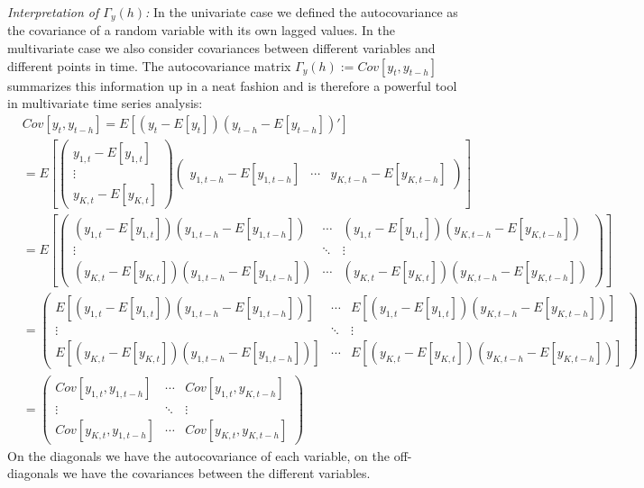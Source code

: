 \begin{enumerate}
\emph{Interpretation of \(\Gamma_y(h)\):}
In the univariate case we defined the autocovariance as the covariance of a random variable with its own lagged values.
In the multivariate case we also consider covariances between different variables and different points in time.
The autocovariance matrix \({\Gamma_y(h)} := Cov[{y_{t},{y_{t-h}}}]\) summarizes this information up in a neat fashion
  and is therefore a powerful tool in multivariate time series analysis:
\begin{align*}
& Cov[{y_{t},{y_{t-h}}}] = E\left[({y_{t}}-E[{{y_{t}}}]) ({y_{t-h}}-E[{{y_{t-h}}}])' \right]
\\
&= E\left[\begin{pmatrix} y_{1,t} - E[y_{1,t}] \\ \vdots \\ y_{K,t} - E[y_{K,t}] \end{pmatrix}
\begin{pmatrix} y_{1,{t-h}} - E[y_{1,{t-h}}] & \cdots & y_{K,{t-h}} - E[y_{K,{t-h}}]  \end{pmatrix} \right]
\\
&= E\left[\begin{pmatrix}
(y_{1,t}- E[y_{1,t}]) (y_{1,{t-h}} - E[y_{1,{t-h}}]) & \cdots & (y_{1,t} - E[y_{1,t}]) (y_{K,{t-h}} - E[y_{K,{t-h}}])
\\
\vdots & \ddots & \vdots
\\
(y_{K,t}- E[y_{K,t}]) (y_{1,{t-h}} - E[y_{1,{t-h}}]) & \cdots & (y_{K,t} - E[y_{K,t}]) (y_{K,{t-h}} - E[y_{K,{t-h}}])
\end{pmatrix} \right]
\\
&= \begin{pmatrix}
E[(y_{1,t}- E[y_{1,t}]) (y_{1,{t-h}} - E[y_{1,{t-h}}])] & \cdots & E[(y_{1,t} - E[y_{1,t}]) (y_{K,{t-h}} - E[y_{K,{t-h}}])]
\\
\vdots & \ddots & \vdots
\\
E[(y_{K,t}- E[y_{K,t}]) (y_{1,{t-h}} - E[y_{1,{t-h}}])] & \cdots & E[(y_{K,t} - E[y_{K,t}]) (y_{K,{t-h}} - E[y_{K,{t-h}}])]
\end{pmatrix}
\\
&=\begin{pmatrix}
Cov[y_{1,t},y_{1,{t-h}}] & \cdots & Cov[y_{1,t},y_{K,{t-h}}]
\\
\vdots & \ddots & \vdots
\\
Cov[y_{K,t},y_{1,{t-h}}] & \cdots & Cov[y_{K,t},y_{K,{t-h}}]
\end{pmatrix}
\end{align*}
On the diagonals we have the autocovariance of each variable,
  on the off-diagonals we have the covariances between the different variables.


\end{enumerate}
